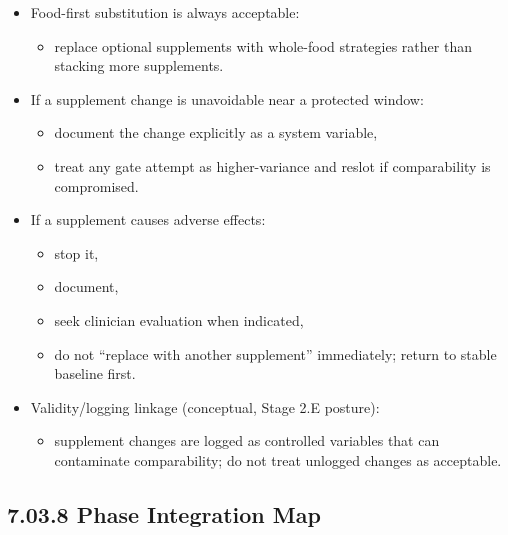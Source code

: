 \documentclass[10pt]{article}
\begin{document}
\begin{itemize}
\item Food-first substitution is always acceptable:
  \begin{itemize}
  \item replace optional supplements with whole-food strategies rather than stacking more supplements.
  \end{itemize}
\item If a supplement change is unavoidable near a protected window:
  \begin{itemize}
  \item document the change explicitly as a system variable,
  \item treat any gate attempt as higher-variance and reslot if comparability is compromised.
  \end{itemize}
\item If a supplement causes adverse effects:
  \begin{itemize}
  \item stop it,
  \item document,
  \item seek clinician evaluation when indicated,
  \item do not “replace with another supplement” immediately; return to stable baseline first.
  \end{itemize}
\item Validity/logging linkage (conceptual, Stage 2.E posture):
  \begin{itemize}
  \item supplement changes are logged as controlled variables that can contaminate comparability; do not treat unlogged changes as acceptable.
  \end{itemize}
\end{itemize}

\subsection*{7.03.8 Phase Integration Map}
{}

\begingroup
\scriptsize
\setlength{\tabcolsep}{2pt}
\renewcommand{\arraystretch}{1.12}
\end{document}
